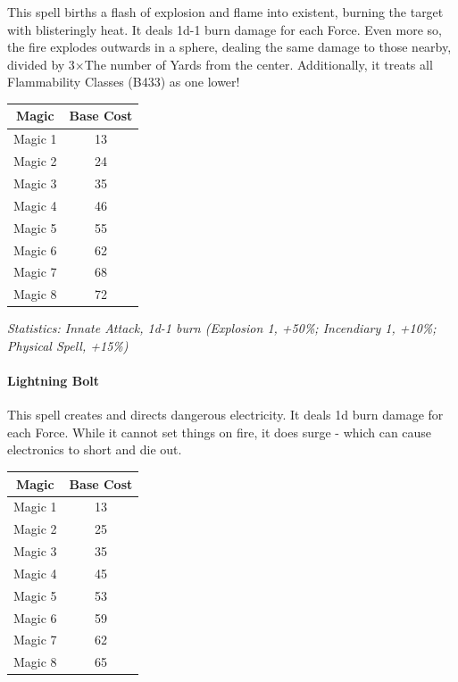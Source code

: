 \begin{multicols}{3}
	This spell births a flash of explosion and flame into existent, burning the target with blisteringly heat. It deals 1d-1 burn damage for each Force. Even more so, the fire explodes outwards in a sphere, dealing the same damage to those nearby, divided by 3\(\times\)The number of Yards from the center. Additionally, it treats all Flammability Classes (B433) as one lower! 
	
	\begin{center}
		\begin{tabular}{|c|c|}
			\hline
			Magic & Base Cost \\
			\hline
			\hline
			Magic 1 & 13 \\
			Magic 2 & 24 \\
			Magic 3 & 35 \\
			Magic 4 & 46 \\
			Magic 5 & 55 \\
			Magic 6 & 62 \\
			Magic 7 & 68 \\
			Magic 8 & 72 \\
			\hline
		\end{tabular}
	\end{center}
	
	\textcolor{OliveGreen}{\textit{Statistics: Innate Attack, 1d-1 burn (Explosion 1, +50\%; Incendiary 1, +10\%; Physical Spell, +15\%)}}
	
	\paragraph{Lightning Bolt}
	
	This spell creates and directs dangerous electricity. It deals 1d burn damage for each Force. While it cannot set things on fire, it does surge - which can cause electronics to short and die out.
	
	\begin{center}
		\begin{tabular}{|c|c|}
			\hline
			Magic & Base Cost \\
			\hline
			\hline
			Magic 1 & 13 \\
			Magic 2 & 25 \\
			Magic 3 & 35 \\
			Magic 4 & 45 \\
			Magic 5 & 53 \\
			Magic 6 & 59 \\
			Magic 7 & 62 \\
			Magic 8 & 65 \\
			\hline
		\end{tabular}
	\end{center}
	

\end{multicols}

